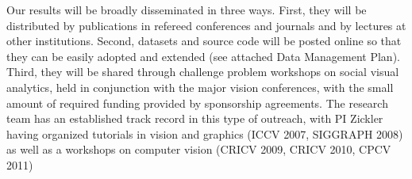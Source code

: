 Our results will be broadly disseminated in three ways. First, they will be distributed by publications in refereed conferences and journals and by lectures at other institutions.  Second, datasets and source code will be posted online so that they can be easily adopted and extended (see attached Data Management Plan). Third, they will be shared through challenge problem workshops on social visual analytics, held in conjunction with the major  vision conferences, with the small amount of required funding provided by sponsorship agreements. The research team has an established track record in this type of outreach, with PI Zickler having organized tutorials in  vision and  graphics (ICCV 2007, SIGGRAPH 2008) as well as a workshops on computer vision (CRICV 2009, CRICV 2010, CPCV 2011)
